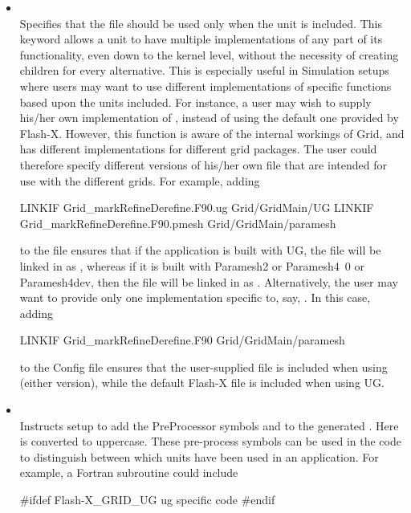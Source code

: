 \begin{itemize}
\item {} \\
Specifies that the file  should be used only when the
unit \unit{} is included. This keyword allows a unit to have
multiple implementations of any part of its functionality, even down
to the kernel level, without the necessity of creating children for every
alternative. This is especially useful in Simulation setups where
users may want to use different implementations of specific functions
based upon the units included.  For instance, a user may wish to supply
his/her own implementation of ,
instead of using the default one provided by Flash-X. However, this function
is aware of the internal workings of \unit{Grid}, and has different implementations for
different grid packages. The user could therefore specify different versions of
his/her own file that are intended for use with the different grids. For example,
adding
\begin{codeseg}
 LINKIF Grid_markRefineDerefine.F90.ug Grid/GridMain/UG
 LINKIF Grid_markRefineDerefine.F90.pmesh Grid/GridMain/paramesh
\end{codeseg}
to the  file ensures that if the application is built with
\unit{UG}, the file
\newline %
 will be linked
in as , whereas if it is built with
\unit{Paramesh2} or \unit{Paramesh4.0} or \unit{Paramesh4dev},
then the file  will be
linked in as . Alternatively,
the user may want to provide only one implementation specific to,
say, \Paramesh. In this case, adding
\begin{codeseg}
 LINKIF Grid_markRefineDerefine.F90 Grid/GridMain/paramesh
\end{codeseg}
to the Config file ensures that the user-supplied file is included
when using \Paramesh (either version), while the default Flash-X file is
included when using \unit{UG}.

\item {} \\
Instructs setup to add the PreProcessor symbols  and
 to the
generated . Here  is 
converted to uppercase.
These pre-process symbols can be used in the code to distinguish
between which units have been used in an application. For example,
a Fortran subroutine could include
\begin{codeseg}
#ifdef Flash-X_GRID_UG
  ug specific code
#endif


\end{codeseg}
\end{itemize}

